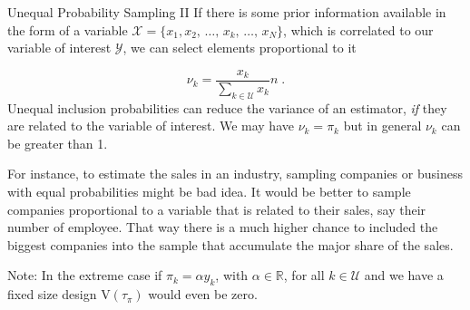 \documentclass[10pt]{beamer}\usepackage[]{graphicx}\usepackage[]{color}
\newcommand{\V}[1]{\text{V}\left(#1\right)}
\begin{document}
\begin{frame}{Unequal Probability Sampling II}
If there is some prior information available in the form of a variable $\mathcal{X} =  \{ x_1{,}x_2{,}\,\ldots{,}\,x_k{,}\,\ldots{,}\,x_N \}$, which is correlated to our variable of interest $\mathcal{Y}$, we can select elements proportional to it

$$\nu_k = \dfrac{x_k}{\sum_{k \in \mathcal{U}} x_k} n \;.$$
Unequal inclusion probabilities can reduce the variance of an estimator, \emph{if} they are related to the variable of interest. We may have $\nu_k=\pi_k$ but in general $\nu_k$ can be greater than 1. \newline

For instance, to estimate the sales in an industry, sampling companies or business with equal probabilities might be bad idea. It would be better to sample companies proportional to a variable that is related to their sales, say their number of employee. That way there is a much higher chance to included the biggest companies into the sample that accumulate the major share of the sales. \newline

Note: In the extreme case if $\pi_k = \alpha y_k$, with  $\alpha \in \mathbb{R}$, for all $k \in \mathcal{U}$ and we have a fixed size design  $\V{ \hat{\tau}_{\pi}}$ would even be zero.

\end{frame}
\end{document}
